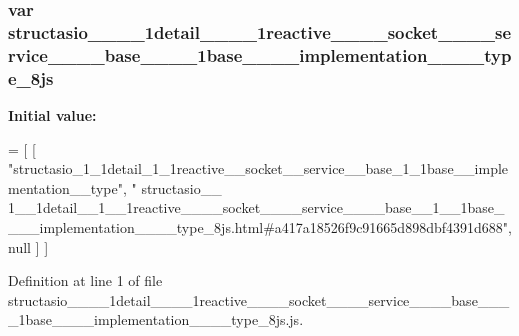 \subsubsection[{structasio\+\_\+\+\_\+1\+\_\+\+\_\+1detail\+\_\+\+\_\+1\+\_\+\+\_\+1reactive\+\_\+\+\_\+\+\_\+\+\_\+socket\+\_\+\+\_\+\+\_\+\+\_\+service\+\_\+\+\_\+\+\_\+\+\_\+base\+\_\+\+\_\+1\+\_\+\+\_\+1base\+\_\+\+\_\+\+\_\+\+\_\+implementation\+\_\+\+\_\+\+\_\+\+\_\+type\+\_\+8js}]{\setlength{\rightskip}{0pt plus 5cm}var structasio\+\_\+\+\_\+\_\+\+\_\+1detail\+\_\+\+\_\+\_\+\+\_\+1reactive\+\_\+\+\_\+\+\_\+\+\_\+socket\+\_\+\+\_\+\+\_\+\+\_\+service\+\_\+\+\_\+\+\_\+\+\_\+base\+\_\+\+\_\+\_\+\+\_\+1base\+\_\+\+\_\+\+\_\+\+\_\+implementation\+\_\+\+\_\+\+\_\+\+\_\+type\+\_\+8js}\label{structasio____1____1detail____1____1reactive________socket________service________base____1____1b2aa0a8d8e16135d6ce2f622215e78784_a1ae5e50d34c6317848d83c986ffc7582}
{\bfseries Initial value\+:}
\begin{DoxyCode}
=
[
    [ \textcolor{stringliteral}{"structasio\_1\_1detail\_1\_1reactive\_\_socket\_\_service\_\_base\_1\_1base\_\_implementation\_\_type"}, \textcolor{stringliteral}{"
      structasio\_\_
      1\_\_1detail\_\_1\_\_1reactive\_\_\_\_socket\_\_\_\_service\_\_\_\_base\_\_1\_\_1base\_\_\_\_implementation\_\_\_\_type\_8js.html#a417a18526f9c91665d898dbf4391d688"}, null ]
]
\end{DoxyCode}


Definition at line 1 of file structasio\+\_\+\+\_\+\_\+\+\_\+1detail\+\_\+\+\_\+\_\+\+\_\+1reactive\+\_\+\+\_\+\+\_\+\+\_\+socket\+\_\+\+\_\+\+\_\+\+\_\+service\+\_\+\+\_\+\+\_\+\+\_\+base\+\_\+\+\_\+\_\+\+\_\+1base\+\_\+\+\_\+\+\_\+\+\_\+implementation\+\_\+\+\_\+\+\_\+\+\_\+type\+\_\+8js.\+js.


